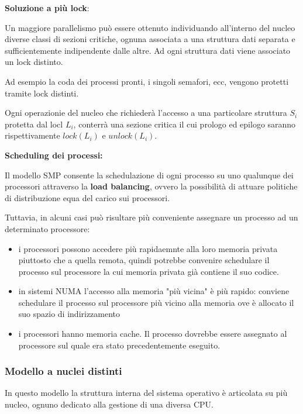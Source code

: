 \documentclass{article}
\begin{document}
\vspace{3mm}
\textbf{Soluzione a più lock}:

Un maggiore parallelismo può essere ottenuto individuando all'interno del nucleo diverse classi di sezioni critiche, ognuna associata a una struttura dati
separata e sufficientemente indipendente dalle altre. Ad ogni struttura dati viene associato un lock distinto.

Ad esempio la coda dei processi pronti, i singoli semafori, ecc, vengono protetti tramite lock distinti.

Ogni operazionie del nucleo che richiederà l'accesso a una particolare struttura $S_i$ protetta dal locl $L_i$, conterrà una sezione critica
il cui prologo ed epilogo saranno rispettivamente $lock(L_i)$ e $unlock(L_i)$.

\vspace{3mm}
\textbf{Scheduling dei processi:}

Il modello SMP consente la schedulazione di ogni processo su uno qualunque dei processori attraverso la \textbf{load balancing}, ovvero la possibilità di
attuare politiche di distribuzione equa del carico sui processori.

Tuttavia, in alcuni casi può risultare più conveniente assegnare un processo ad un determinato processore:
\begin{itemize}
    \item i processori possono accedere più rapidaemnte alla loro memoria privata piuttosto che a quella remota, quindi potrebbe convenire schedulare il processo
    sul processore la cui memoria privata già contiene il suo codice.
    \item in sistemi NUMA l'accesso alla memoria "più vicina" è più rapido: conviene schedulare il processo sul processore più vicino alla memoria ove
    è allocato il suo spazio di indirizzamento
    \item i processori hanno memoria cache. Il processo dovrebbe essere assegnato al processore sul quale era stato precedentemente eseguito.
\end{itemize}

\subsubsection{Modello a nuclei distinti}

In questo modello la struttura interna del sistema operativo è articolata su più nucleo, ognuno dedicato alla gestione di una diversa CPU.
\end{document}
